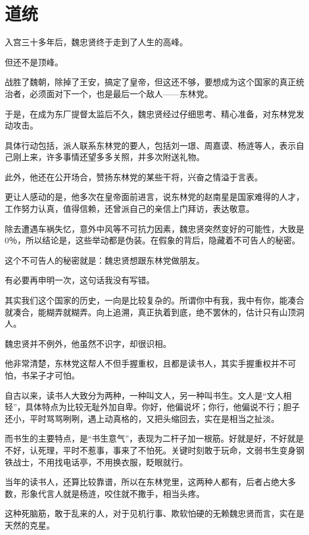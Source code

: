 \section{道统}
\ifnum{}
	\begin{multicols}{\theparacolNo}
		\fi
		入宫三十多年后，魏忠贤终于走到了人生的高峰。

		但还不是顶峰。

		战胜了魏朝，除掉了王安，搞定了皇帝，但这还不够，要想成为这个国家的真正统治者，必须面对下一个，也是最后一个敌人——东林党。

		于是，在成为东厂提督太监后不久，魏忠贤经过仔细思考、精心准备，对东林党发动攻击。

		具体行动包括，派人联系东林党的要人，包括刘一璟、周嘉谟、杨涟等人，表示自己刚上来，许多事情还望多多关照，并多次附送礼物。

		此外，他还在公开场合，赞扬东林党的某些干将，兴奋之情溢于言表。

		更让人感动的是，他多次在皇帝面前进言，说东林党的赵南星是国家难得的人才，工作努力认真，值得信赖，还曾派自己的亲信上门拜访，表达敬意。

		除去遭遇车祸失忆，意外中风等不可抗力因素，魏忠贤突然变好的可能性，大致是0％，所以结论是，这些举动都是伪装。在假象的背后，隐藏着不可告人的秘密。

		这个不可告人的秘密就是：魏忠贤想跟东林党做朋友。

		有必要再申明一次，这句话我没有写错。

		其实我们这个国家的历史，一向是比较复杂的。所谓你中有我，我中有你，能凑合就凑合，能糊弄就糊弄。向上追溯，真正执着到底，绝不罢休的，估计只有山顶洞人。

		魏忠贤并不例外，他虽然不识字，却很识相。

		他非常清楚，东林党这帮人不但手握重权，且都是读书人，其实手握重权并不可怕，书呆子才可怕。

		自古以来，读书人大致分为两种，一种叫文人，另一种叫书生。文人是“文人相轻”，具体特点为比较无耻外加自卑。你好，他偏说坏；你行，他偏说不行；胆子还小，平时骂骂咧咧，遇上动真格的，又把头缩回去，实在是相当之扯淡。

		而书生的主要特点，是“书生意气”，表现为二杆子加一根筋。好就是好，不好就是不好，认死理，平时不惹事，事来了不怕死。关键时刻敢于玩命，文弱书生变身钢铁战士，不用找电话亭，不用换衣服，眨眼就行。

		当年的读书人，还算比较靠谱，所以在东林党里，这两种人都有，后者占绝大多数，形象代言人就是杨涟，咬住就不撒手，相当头疼。

		这种死脑筋，敢于乱来的人，对于见机行事、欺软怕硬的无赖魏忠贤而言，实在是天然的克星。


\end{multicols}

